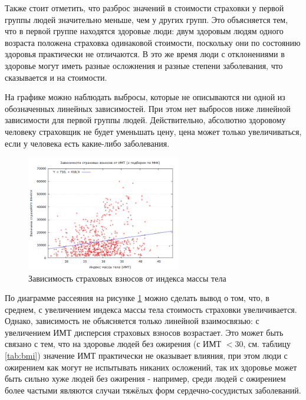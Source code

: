 \documentclass[a4paper,12pt]{article}
\begin{document}
Также стоит отметить, что разброс значений в стоимости страховки у первой группы людей значительно меньше, чем у других групп. Это объясняется тем, что в первой группе находятся здоровые люди: двум здоровым людям одного возраста положена страховка одинаковой стоимости, поскольку они по состоянию здоровья практически не отличаются. В это же время люди с отклонениями в здоровье могут иметь разные осложнения и разные степени заболевания, что сказывается и на стоимости.

На графике можно наблюдать выбросы, которые не описываются ни одной из обозначенных линейных зависимостей. При этом нет выбросов ниже линейной зависимости для первой группы людей. Действительно, абсолютно здоровому человеку страховщик не будет уменьшать цену, цена может только увеличиваться, если у человека есть какие-либо заболевания. 

\begin{figure}[H]
	\includegraphics[width=0.6\textwidth]{../[graphics]/сharges-bmi.png}
	\centering
	\caption{Зависимость страховых взносов от индекса массы тела}
	\label{fig:charges-bmi}
\end{figure}

По диаграмме рассеяния на рисунке \ref{fig:charges-bmi} можно сделать вывод о том, что, в среднем, с увеличением индекса массы тела стоимость страховки увеличивается. Однако, зависимость не объясняется только линейной взаимосвязью: с увеличением ИМТ дисперсия страховых взносов возрастает. Это может быть связано с тем, что на здоровье людей без ожирения (с ИМТ $<30$, см. таблицу \ref{tab:bmi}) значение ИМТ практически не оказывает влияния, при этом люди с ожирением как могут не испытывать никаних осложений, так их здоровье может быть сильно хуже людей без ожирения - например, среди людей с ожирением более частыми являются случаи тяжёлых форм сердечно-сосудистых заболеваний.
\end{document}
